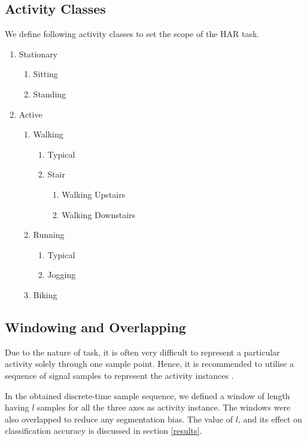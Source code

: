 \documentclass[5p]{elsarticle}
\begin{document}
\subsection{Activity Classes}
\label{activity_classes}
We define following activity classes to set the scope of the HAR task.
\begin{enumerate}
	\item Stationary
	\begin{enumerate}
		\item Sitting
		\item Standing
	\end{enumerate}
	\item Active
	\begin{enumerate}
		\item Walking
		\begin{enumerate}
			\item Typical
			\item Stair
			\begin{enumerate}
				\item Walking Upstairs
				\item Walking Downstairs
			\end{enumerate}
		\end{enumerate}
		\item Running
		\begin{enumerate}
			\item Typical
			\item Jogging
		\end{enumerate}
		\item Biking
	\end{enumerate}
\end{enumerate}

\subsection{Windowing and Overlapping}
Due to the nature of task, it is often very difficult to represent a particular activity solely through one sample point. Hence, it is recommended to utilise a sequence of signal samples to represent the activity instances \cite{Banos2014}.

In the obtained discrete-time sample sequence, we defined a window of length having $l$ samples for all the three axes as activity instance. The windows were also overlapped to reduce any segmentation bias. The value of $l$, and its effect on classification accuracy is discussed in section \ref{results}.
\end{document}
